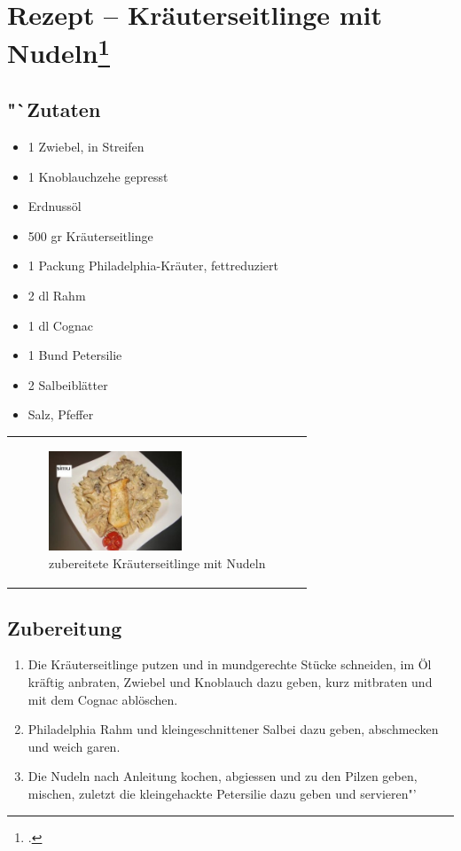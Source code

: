 \documentclass[a4paper,abstracton]{scrreprt}
\begin{document}
\section[Rezept -- Kräuterseitlinge mit Nudeln]{Rezept -- Kräuterseitlinge mit Nudeln\footcite{rezept}}

\begin{minipage}{0.45\textwidth}

\subsection{"`Zutaten}
\begin{itemize}
\item 1 Zwiebel, in Streifen
\item 1 Knoblauchzehe gepresst
\item Erdnussöl
\item 500 gr Kräuterseitlinge
\item 1 Packung Philadelphia-Kräuter, fettreduziert
\item 2 dl Rahm
\item 1 dl Cognac
\item 1 Bund Petersilie
\item 2 Salbeiblätter
\item Salz, Pfeffer
\end{itemize}
\end{minipage}%
\begin{minipage}{0.45\textwidth}
\begin{tabular}{p{\textwidth}}

\begin{figure}[H]
\centering
\includegraphics[width=150px]{rezept}
\caption[zubereitete Kräuterseitlinge mit Nudeln]{zubereitete Kräuterseitlinge mit Nudeln\protect\footnotemark}
\label{fig:rezept}
\end{figure}

\end{tabular}
\end{minipage}%

\subsection{Zubereitung}
\begin{enumerate}
\item Die Kräuterseitlinge putzen und in mundgerechte Stücke schneiden, im Öl kräftig anbraten, Zwiebel und Knoblauch dazu geben, kurz mitbraten und mit dem Cognac ablöschen.
\item Philadelphia Rahm und kleingeschnittener Salbei dazu geben, abschmecken und weich garen.
\item Die Nudeln nach Anleitung kochen, abgiessen und zu den Pilzen geben, mischen, zuletzt die kleingehackte Petersilie dazu geben und servieren"'
\end{enumerate}

\printbibliography[heading=lit]
\end{document}
